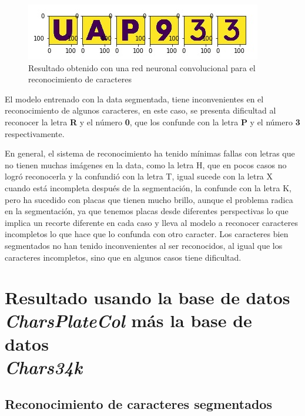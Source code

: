 \begin{figure}[H]
\centering
\includegraphics[width=0.9\linewidth]{imagenes/RESULTADOS/resultados_data_segmen.jpg} \caption{Resultado obtenido con una red neuronal convolucional para el reconocimiento de caracteres}
\label{fig:Resultado del reconocimiento de caracteres charscolplate3.5k}
\end{figure}

El modelo entrenado con la data segmentada, tiene inconvenientes en el reconocimiento de algunos caracteres, en este caso, se presenta dificultad al reconocer la letra \textbf{R} y el número \textbf{0}, que los confunde con la letra \textbf{P} y el número \textbf{3} respectivamente.

En general, el sistema de reconocimiento ha tenido mínimas fallas con letras que no tienen muchas imágenes en la data, como la letra H, que en pocos casos no logró reconocerla y la confundió con la letra T, igual sucede con la letra X cuando está incompleta después de la segmentación, la confunde con la letra K, pero ha sucedido con placas que tienen mucho brillo, aunque el problema radica en la segmentación, ya que tenemos placas desde diferentes perspectivas lo que implica un recorte diferente en cada caso y lleva al modelo a reconocer caracteres incompletos lo que hace que lo confunda con otro caracter. Los caracteres bien segmentados no han tenido inconvenientes al ser reconocidos, al igual que los caracteres incompletos, sino que en algunos casos tiene dificultad.

\section{Resultado usando la base de datos\\
\textit{CharsPlateCol} más la base de datos\\
\textit{{Chars34k}}}

\subsection{Reconocimiento de caracteres segmentados}


